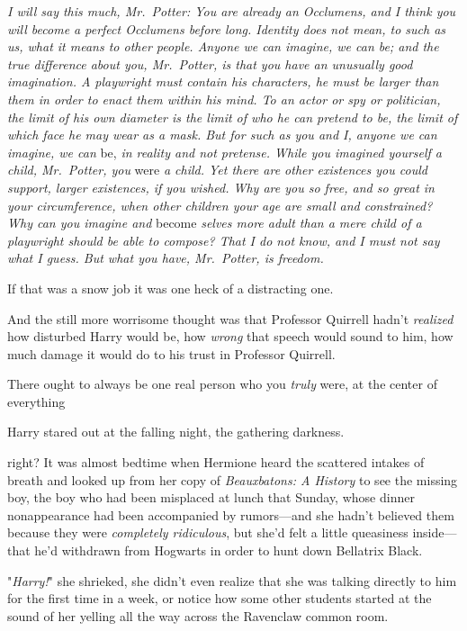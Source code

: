 \emph{I will say this much, Mr.~Potter: You are already an Occlumens, and I
think you will become a perfect Occlumens before long. Identity does not mean,
to such as us, what it means to other people. Anyone we can imagine, we can be;
and the true difference about you, Mr.~Potter, is that you have an unusually
good imagination. A playwright must contain his characters, he must be larger
than them in order to enact them within his mind. To an actor or spy or
politician, the limit of his own diameter is the limit of who he can pretend to
be, the limit of which face he may wear as a mask. But for such as you and I,
anyone we can imagine, we can} be, \emph{in reality and not pretense. While you
imagined yourself a child, Mr.~Potter, you} were \emph{a child. Yet there are
other existences you could support, larger existences, if you wished. Why are
you so free, and so great in your circumference, when other children your age
are small and constrained? Why can you imagine and} become \emph{selves more
adult than a mere child of a playwright should be able to compose? That I do
not know, and I must not say what I guess. But what you have, Mr.~Potter, is
freedom.}

If that was a snow job it was one heck of a distracting one.

And the still more worrisome thought was that Professor Quirrell hadn't
\emph{realized} how disturbed Harry would be, how \emph{wrong} that speech
would sound to him, how much damage it would do to his trust in Professor
Quirrell.

There ought to always be one real person who you \emph{truly} were, at the
center of everything{\el}

Harry stared out at the falling night, the gathering darkness.

{\el} right?
\sbreak
It was almost bedtime when Hermione heard the scattered intakes of breath and
looked up from her copy of \emph{Beauxbatons: A History} to see the missing
boy, the boy who had been misplaced at lunch that Sunday, whose dinner
nonappearance had been accompanied by rumors---and she hadn't believed them
because they were \emph{completely ridiculous}, but she'd felt a little
queasiness inside---that he'd withdrawn from Hogwarts in order to hunt down
Bellatrix Black.

"\emph{Harry!}" she shrieked, she didn't even realize that she was talking
directly to him for the first time in a week, or notice how some other students
started at the sound of her yelling all the way across the Ravenclaw common
room.

